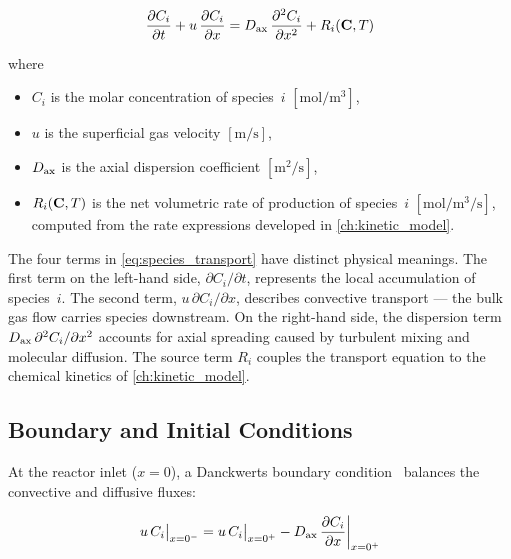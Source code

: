 %
\begin{equation}
  \frac{\partial C_i}{\partial t}
  + u\,\frac{\partial C_i}{\partial x}
  = D_{\mathrm{ax}}\,\frac{\partial^2 C_i}{\partial x^2}
  + R_i(\mathbf{C}, T)
  \label{eq:species_transport}
\end{equation}
%

where

%
\begin{itemize}
  \item \(C_i\) is the molar concentration of species~\(i\)
        \([\si{\mole\per\metre\cubed}]\),
  \item \(u\) is the superficial gas velocity \([\si{\metre\per\second}]\),
  \item \(D_{\mathrm{ax}}\) is the axial dispersion coefficient
        \([\si{\metre\squared\per\second}]\),
  \item \(R_i(\mathbf{C}, T)\) is the net volumetric rate of production of
        species~\(i\) \([\si{\mole\per\metre\cubed\per\second}]\), computed
        from the rate expressions developed in
        \cref{ch:kinetic_model}.
\end{itemize}

The four terms in \cref{eq:species_transport} have distinct physical meanings. The first term on the left-hand side, \(\partial C_i / \partial t\), represents the local accumulation of species~\(i\). The second term, \(u\,\partial C_i / \partial x\), describes convective transport --- the bulk gas flow carries species downstream. On the right-hand side, the dispersion term \(D_{\mathrm{ax}}\,\partial^2 C_i / \partial x^2\) accounts for axial spreading caused by turbulent mixing and molecular diffusion. The source term \(R_i\) couples the transport equation to the chemical kinetics of \cref{ch:kinetic_model}.

\subsection{Boundary and Initial Conditions}\label{ssec:boundary_conditions}

At the reactor inlet (\(x = 0\)), a Danckwerts boundary condition~\cite{Danckwerts1953} balances the convective and diffusive fluxes:

%
\begin{equation}
  u\,C_i\big|_{x=0^-}
  = u\,C_i\big|_{x=0^+}
  - D_{\mathrm{ax}}\,\frac{\partial C_i}{\partial x}\bigg|_{x=0^+}
  \label{eq:danckwerts_inlet}
\end{equation}
%

